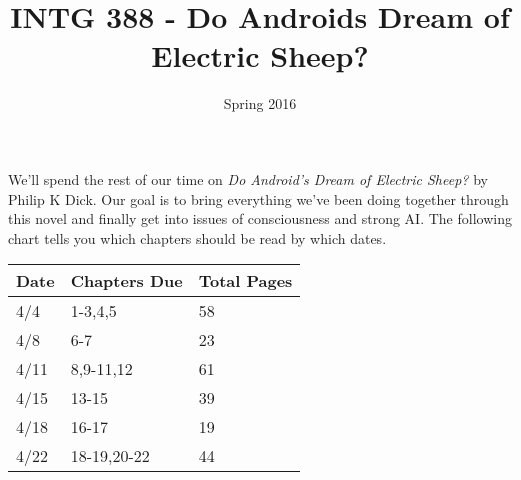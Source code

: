 \documentclass[]{tufte-handout}
\title{INTG 388 - Do Androids Dream of Electric Sheep?}
\author{}
\date{ Spring 2016 }
\begin{document}
\maketitle

We'll spend the rest of our time on \textit{Do Android's Dream of Electric Sheep?}\cite{dick_androids_2008} by Philip K Dick. Our goal is to bring everything we've been doing together through this novel and finally get into issues of consciousness and strong AI. The following chart tells you which chapters should be read by which dates.

\begin{center}
\begin{tabular}{lll}
Date & Chapters Due & Total Pages  \\ \hline
4/4 & 1-3,4,5 & 58 \\
4/8 & 6-7 & 23  \\
4/11 & 8,9-11,12 & 61  \\
4/15 & 13-15 & 39 \\
4/18 & 16-17 & 19  \\
4/22 & 18-19,20-22 & 44 
\end{tabular}
\end{center}




\end{document}
